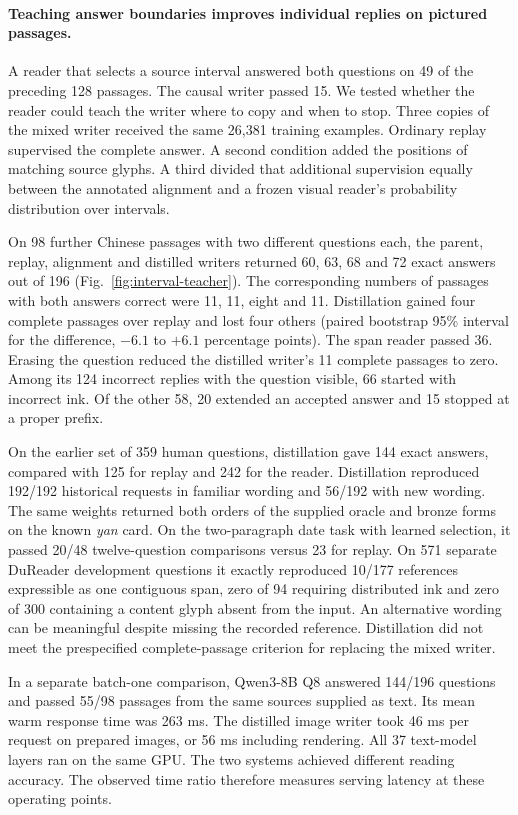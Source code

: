 \paragraph{Teaching answer boundaries improves individual replies on pictured passages.}
A reader that selects a source interval answered both questions on 49 of the preceding 128 passages. The causal writer passed 15. We tested whether the reader could teach the writer where to copy and when to stop. Three copies of the mixed writer received the same 26,381 training examples. Ordinary replay supervised the complete answer. A second condition added the positions of matching source glyphs. A third divided that additional supervision equally between the annotated alignment and a frozen visual reader's probability distribution over intervals.

On 98 further Chinese passages with two different questions each, the parent, replay, alignment and distilled writers returned 60, 63, 68 and 72 exact answers out of 196 (Fig.~\ref{fig:interval-teacher}). The corresponding numbers of passages with both answers correct were 11, 11, eight and 11. Distillation gained four complete passages over replay and lost four others (paired bootstrap 95\% interval for the difference, $-6.1$ to $+6.1$ percentage points). The span reader passed 36. Erasing the question reduced the distilled writer's 11 complete passages to zero. Among its 124 incorrect replies with the question visible, 66 started with incorrect ink. Of the other 58, 20 extended an accepted answer and 15 stopped at a proper prefix.

On the earlier set of 359 human questions, distillation gave 144 exact answers, compared with 125 for replay and 242 for the reader. Distillation reproduced 192/192 historical requests in familiar wording and 56/192 with new wording. The same weights returned both orders of the supplied oracle and bronze forms on the known \textit{yan} card. On the two-paragraph date task with learned selection, it passed 20/48 twelve-question comparisons versus 23 for replay. On 571 separate DuReader development questions it exactly reproduced 10/177 references expressible as one contiguous span, zero of 94 requiring distributed ink and zero of 300 containing a content glyph absent from the input. An alternative wording can be meaningful despite missing the recorded reference. Distillation did not meet the prespecified complete-passage criterion for replacing the mixed writer.

In a separate batch-one comparison, Qwen3-8B Q8 answered 144/196 questions and passed 55/98 passages from the same sources supplied as text. Its mean warm response time was 263 ms. The distilled image writer took 46 ms per request on prepared images, or 56 ms including rendering. All 37 text-model layers ran on the same GPU. The two systems achieved different reading accuracy. The observed time ratio therefore measures serving latency at these operating points.

